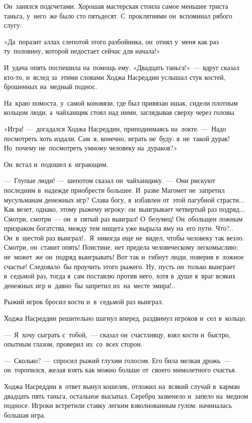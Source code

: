 \documentclass[12pt,a4paper]{book}
\begin{document}
Он~занялся подсчетами. Хорошая мастерская стоила самое меньшее триста таньга, у~него~же было сто пятьдесят. С~проклятиями он~вспоминал рябого слугу:

«Да~поразит аллах слепотой этого разбойника, он~отнял у~меня как раз ту~половину, которой недостает сейчас для начала!»

И~удача опять поспешила на~помощь ему. «Двадцать таньга!»~— вдруг сказал кто-то, и~вслед за~этими словами Ходжа Насреддин услышал стук костей, брошенных на~медный поднос.

На~краю помоста, у~самой коновязи, где был привязан ишак, сидели плотным кольцом люди, а~чайханщик стоял над ними, заглядывая сверху через головы.

«Игра! —~догадался Ходжа Насреддин, приподнимаясь на~локте. —~Надо посмотреть хоть издали. Сам~я, конечно, играть не~буду: я~не~такой дурак! Но~почему не~посмотреть умному человеку на~дураков?»

Он~встал и~подошел к~играющим.

—~Глупые люди! —~шепотом сказал он~чайханщику. —~Они рискуют последним в~надежде приобрести большее. И~разве Магомет не~запретил мусульманам денежных игр? Слава богу, я~избавлен от~этой пагубной страсти... Как везет, однако, этому рыжему игроку: он~выигрывает четвертый раз подряд... Смотри, смотри~— он~в~пятый раз выиграл! О~безумец! Он~обольщен ложным призраком богатства, между тем нищета уже вырыла яму на~его пути. Что?.. Он~в~шестой раз выиграл!.. Я~никогда еще не~видел, чтобы человеку так везло. Смотри, он~ставит опять! Поистине, нет предела человеческому легкомыслию; не~может~же он~подряд выигрывать! Вот так и~гибнут люди, поверив в~ложное счастье! Следовало~бы проучить этого рыжего. Ну, пусть он~только выиграет в~седьмой раз, тогда я~сам поставлю против него, хотя в~душе я~враг всяких денежных игр и~давно~бы запретил их~на~месте эмира!..

Рыжий игрок бросил кости и~в~седьмой раз выиграл.

Ходжа Насреддин решительно шагнул вперед, раздвинул игроков и~сел в~кольцо.

—~Я~хочу сыграть с~тобой,~— сказал он~счастливцу, взял кости и~быстро, опытным глазом, проверил их~со~всех сторон.

—~Сколько? —~спросил рыжий глухим голосом. Его била мелкая дрожь~— он~торопился, желая взять как можно больше от~своего мимолетного счастья.

Ходжа Насреддин в~ответ вынул кошелек, отложил на~всякий случай в~карман двадцать пять таньга, остальное высыпал. Серебро зазвенело и~запело на~медном подносе. Игроки встретили ставку легким взволнованным гулом: начиналась большая игра.
\end{document}
